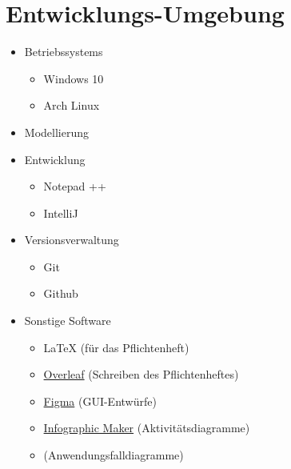 \section{Entwicklungs-Umgebung}
        \begin{itemize}[noitemsep]
            \item \glspl{Betriebssystem} 
                \begin{itemize}[noitemsep]
                    \item Windows 10
                    \item Arch Linux
                \end{itemize}
            \item Modellierung %
            \item Entwicklung %
            \begin{itemize}[noitemsep]
                \item Notepad ++
                \item IntelliJ
            \end{itemize}
            \item \gls{Versionsverwaltung}
                \begin{itemize}[noitemsep]
                    \item Git
                    \item Github
                \end{itemize}
            \item Sonstige Software
                \begin{itemize}[noitemsep]
                    \item \LaTeX \hspace{0.1cm} (für das Pflichtenheft)
                    \item \href{https://de.overleaf.com}{Overleaf} (Schreiben des Pflichtenheftes)
                    \item \href{https://www.figma.com}{Figma} (GUI-Entwürfe)
                    \item \href{https://online.visual-paradigm.com/}{Infographic Maker} (Aktivitätsdiagramme)
                    \item \href{https://app.diagrams.net/}{} (Anwendungsfalldiagramme)
                \end{itemize}
        \end{itemize}